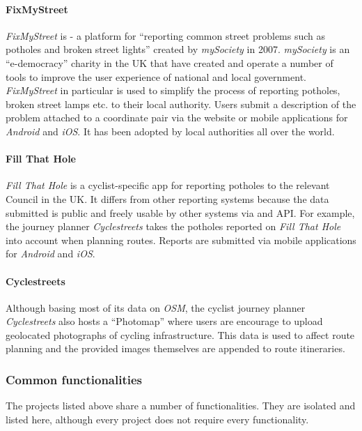 \documentclass{article}
\begin{document}
		\paragraph{FixMyStreet}
		\emph{FixMyStreet} is - a platform for ``reporting common street problems such as potholes and broken street lights''\cite{_mysociety/fixmystreet_2015} created by \emph{mySociety} in 2007. \emph{mySociety} is an ``e-democracy'' charity in the UK that have created and operate a number of tools to improve the user experience of national and local government. \emph{FixMyStreet} in particular is used to simplify the process of reporting potholes, broken street lamps etc. to their local authority. Users submit a description of the problem attached to a coordinate pair via the website or mobile applications for \emph{Android} and \emph{iOS}. It has been adopted by local authorities all over the world.

		\paragraph{Fill That Hole}
		\emph{Fill That Hole} is a cyclist-specific app for reporting potholes to the relevant Council in the UK. It differs from other reporting systems because the data submitted is public and freely usable by other systems via and API. For example, the journey planner \emph{Cyclestreets} takes the potholes reported on \emph{Fill That Hole} into account when planning routes. Reports are submitted via mobile applications for \emph{Android} and \emph{iOS}.

		\paragraph{Cyclestreets}
		Although basing most of its data on \emph{OSM}, the cyclist journey planner \emph{Cyclestreets} also hosts a ``Photomap'' where users are encourage to upload geolocated photographs of cycling infrastructure. This data is used to affect route planning and the provided images themselves are appended to route itineraries\cite{_cyclestreets_????}.

		\subsubsection{Common functionalities}
		\label{sec:common-functionalities}

		The projects listed above share a number of functionalities. They are isolated and listed here, although every project does not require every functionality.
\end{document}
